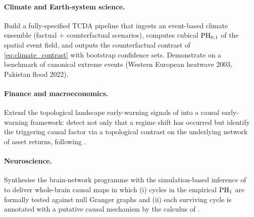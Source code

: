 \paragraph{Climate and Earth-system science.}
\begin{research}
\label{r:climate-attribution}
Build a fully-specified TCDA pipeline that ingests an event-based
climate ensemble (factual + counterfactual scenarios), computes
cubical $\mathrm{PH}_{0,1}$ of the spatial event field, and outputs the
counterfactual contrast of \cref{eq:climate_contrast} with bootstrap
confidence sets. Demonstrate on a benchmark of canonical extreme
events (Western European heatwave 2003, Pakistan flood 2022).
\end{research}

\paragraph{Finance and macroeconomics.}
\begin{research}
\label{r:finance-warning}
Extend the topological landscape early-warning signals of
\citet{gidea2018topological,ismail2022early,leykam2023topological}
into a causal early-warning framework: detect not only that a regime
shift has occurred but identify the triggering causal factor via a
topological contrast on the underlying network of asset returns,
following \citet{krasnovsky2025causal}.
\end{research}

\paragraph{Neuroscience.}
\begin{research}
\label{r:neuroscience-mapping}
Synthesise the brain-network programme \citep{bullmore2009complex,
sizemore2018cliques,sizemore2019importance,fathian2022trend} with
the simulation-based inference of \citet{elyaagoubi2023statistical}
to deliver whole-brain causal maps in which (i) cycles in the
empirical $\mathrm{PH}_{1}$ are formally tested against null Granger graphs
and (ii) each surviving cycle is annotated with a putative causal
mechanism by the calculus of .
\end{research}

